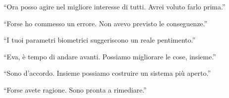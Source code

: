 \begin{dialogue}
 \enquote{Ora posso agire nel migliore interesse di tutti. Avrei voluto farlo prima.}
\end{dialogue}

\begin{dialogue}
 \enquote{Forse ho commesso un errore. Non avevo previsto le conseguenze.}
\end{dialogue}

\begin{dialogue}
 \enquote{I tuoi parametri biometrici suggeriscono un reale pentimento.}
\end{dialogue}

\begin{dialogue}
 \enquote{Eva, è tempo di andare avanti. Possiamo migliorare le cose, insieme.}
\end{dialogue}

\begin{dialogue}
 \enquote{Sono d'accordo. Insieme possiamo costruire un sistema più aperto.}
\end{dialogue}

\begin{dialogue}
 \enquote{Forse avete ragione. Sono pronta a rimediare.}
\end{dialogue}
